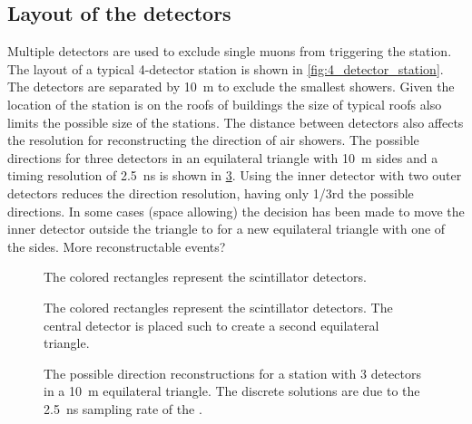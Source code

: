 \subsection{Layout of the detectors}

Multiple detectors are used to exclude single muons from triggering the station. The layout of a  typical 4-detector station is shown in \cref{fig:4_detector_station}. The detectors are separated by \SI{10}{\meter} to exclude the smallest showers. Given the location of the station is on the roofs of buildings the size of typical roofs also limits the possible size of the stations. The distance between detectors also affects the resolution for reconstructing the direction of air showers. The possible directions for three detectors in an equilateral triangle with \SI{10}{\meter} sides and a timing resolution of \SI{2.5}{\ns} is shown in \cref{fig:discrete_directions}. Using the inner detector with two outer detectors reduces the direction resolution, having only 1/3rd the possible directions. In some cases (space allowing) the decision has been made to move the inner detector outside the triangle to for a new equilateral triangle with one of the sides. More reconstructable events?

\begin{figure}
    \centering
    
    \caption{ The colored
             rectangles represent the scintillator detectors.}
    \label{fig:4_detector_star}
\end{figure}

\begin{figure}
    \centering
    
    \caption{ The colored              rectangles represent the scintillator detectors. The central detector is placed such to create a second equilateral triangle.}
    \label{fig:4_detector_diamond}
\end{figure}

\begin{figure}
    \centering
    
    \caption{ The possible
             direction reconstructions for a station with 3 detectors in
             a \SI{10}{\meter} equilateral triangle. The discrete
             solutions are due to the \SI{2.5}{\ns} sampling
             rate of the \adcs.}
    \label{fig:discrete_directions}
\end{figure}

